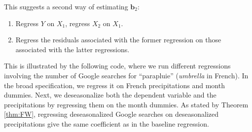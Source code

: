 \documentclass[
  12pt,
]{book}
\newenvironment{Shaded}{\begin{snugshade}}{\end{snugshade}}
\newcommand{\AttributeTok}[1]{\textcolor[rgb]{0.13,0.29,0.53}{#1}}
\newcommand{\DecValTok}[1]{\textcolor[rgb]{0.00,0.00,0.81}{#1}}
\newcommand{\FunctionTok}[1]{\textcolor[rgb]{0.13,0.29,0.53}{\textbf{#1}}}
\newcommand{\NormalTok}[1]{#1}
\newcommand{\OtherTok}[1]{\textcolor[rgb]{0.56,0.35,0.01}{#1}}
\newcommand{\SpecialCharTok}[1]{\textcolor[rgb]{0.81,0.36,0.00}{\textbf{#1}}}
\newcommand{\StringTok}[1]{\textcolor[rgb]{0.31,0.60,0.02}{#1}}
\providecommand{\tightlist}{%
  \setlength{\itemsep}{0pt}\setlength{\parskip}{0pt}}
\theoremstyle{definition}
\theoremstyle{definition}
\theoremstyle{definition}
\theoremstyle{definition}
\theoremstyle{remark}
\begin{document}
This suggests a second way of estimating \(\mathbf{b}_2\):

\begin{enumerate}
\def\labelenumi{\arabic{enumi}.}
\tightlist
\item
  Regress \(Y\) on \(X_1\), regress \(X_2\) on \(X_1\).
\item
  Regress the residuals associated with the former regression on those associated with the latter regressions.
\end{enumerate}

This is illustrated by the following code, where we run different regressions involving the number of Google searches for ``parapluie'' (\emph{umbrella} in French). In the broad specification, we regress it on French precipitations and month dummies. Next, we deseasonalize both the dependent variable and the precipitations by regressing them on the month dummies. As stated by Theorem \ref{thm:FW}, regressing deseasonalized Google searches on deseasonalized precipitations give the same coefficient as in the baseline regression.

\begin{Shaded}
\end{Shaded}
\end{document}
